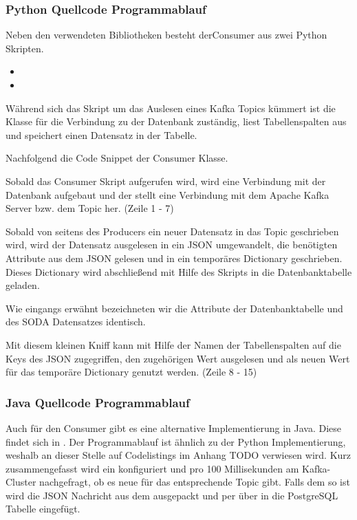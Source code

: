 \subsubsection{Python Quellcode Programmablauf}
Neben den verwendeten Bibliotheken besteht derConsumer aus zwei Python Skripten.

\begin{itemize}
  \item {}
  \item {}
\end{itemize}

Während sich das  Skript um das Auslesen eines Kafka Topics kümmert ist die  Klasse
für die Verbindung zu der Datenbank zuständig, liest Tabellenspalten aus und speichert einen Datensatz in der Tabelle.

Nachfolgend die Code Snippet der Consumer Klasse.



Sobald das Consumer Skript aufgerufen wird, wird eine Verbindung mit der Datenbank
aufgebaut und der  stellt eine Verbindung mit dem Apache Kafka
Server bzw. dem Topic  her.
(Zeile 1 - 7)

Sobald von seitens des Producers ein neuer Datensatz in das Topic  geschrieben wird,
wird der Datensatz ausgelesen in ein \ac{JSON} umgewandelt, die benötigten Attribute aus dem \ac{JSON} gelesen
und in ein temporäres Dictionary geschrieben.\\
Dieses Dictionary wird abschließend mit Hilfe des  Skripts in die
Datenbanktabelle geladen.

Wie eingangs erwähnt bezeichneten wir die Attribute der Datenbanktabelle und des \ac{SODA} Datensatzes identisch.

Mit diesem kleinen \glqq Kniff\grqq{} kann mit Hilfe der Namen der Tabellenspalten
auf die Keys des \ac{JSON} zugegriffen, den zugehörigen Wert ausgelesen und als neuen Wert für das temporäre Dictionary genutzt werden.
(Zeile 8 - 15)

\subsubsection{Java Quellcode Programmablauf}
Auch für den Consumer gibt es eine alternative Implementierung in Java.
Diese findet sich in .
Der Programmablauf ist ähnlich zu der Python Implementierung, weshalb an dieser Stelle auf Codelistings im Anhang TODO verwiesen wird.
Kurz zusammengefasst wird ein  konfiguriert und pro 100 Millisekunden am Kafka-Cluster nachgefragt, ob es neue  für das entsprechende Topic gibt.
Falls dem so ist wird die \ac{JSON} Nachricht aus dem  ausgepackt und per  über  in die PostgreSQL Tabelle eingefügt.
\newpage